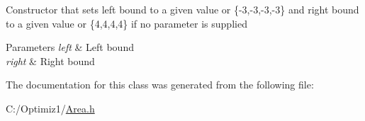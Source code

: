 Constructor that sets left bound to a given value or \{-\/3,-\/3,-\/3,-\/3\} and right bound to a given value or \{4,4,4,4\} if no parameter is supplied 
\begin{DoxyParams}{Parameters}
{\em left} & Left bound \\
\hline
{\em right} & Right bound \\
\hline
\end{DoxyParams}


The documentation for this class was generated from the following file\+:\begin{DoxyCompactItemize}
\item 
C\+:/\+Optimiz1/\hyperlink{_area_8h}{Area.\+h}\end{DoxyCompactItemize}
